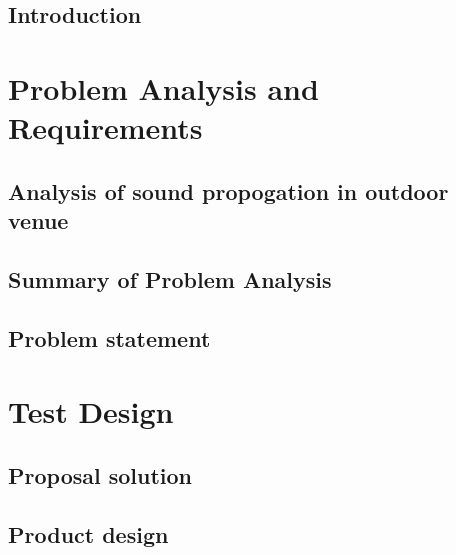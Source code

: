 \glsresetall


 \graphicspath{{figures/analysing/}}
\chapter{Introduction}\label{ch:intro}



\part{Problem Analysis and Requirements}\label{pt:analysis} \glsresetall
\graphicspath{{figures/analysis/}}
\chapter{Analysis of sound propogation in outdoor venue}\label{ch:analysis}
%




\chapter{Summary of Problem Analysis}\label{ch:analysis:summary}



\chapter{Problem statement}\label{ch:statement}




\part{Test Design}\label{pt:design} 
\graphicspath{{figures/design/}}	
%
\chapter{Proposal solution}


\chapter{Product design}



